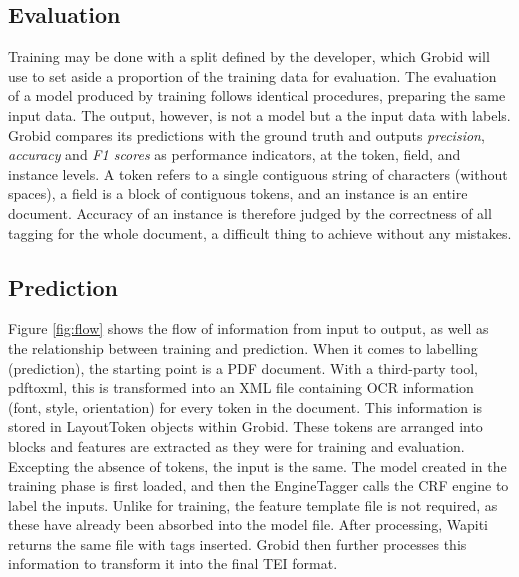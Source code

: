 \documentclass[11pt, oneside]{scrartcl}   	%
\begin{document}
\subsection{Evaluation}

Training may be done with a split defined by the developer, which Grobid will use to set aside a proportion of the training data for evaluation. The evaluation of a model produced by training follows identical procedures, preparing the same input data. The output, however, is not a model but a the input data with labels. Grobid compares its predictions with the ground truth and outputs \emph{precision}, \emph{accuracy} and \emph{F1 scores} as performance indicators, at the token, field, and instance levels. A token refers to a single contiguous string of characters (without spaces), a field is a block of contiguous tokens, and an instance is an entire document. Accuracy of an instance is therefore judged by the correctness of all tagging for the whole document, a difficult thing to achieve without any mistakes.

\subsection{Prediction}

Figure \ref{fig:flow} shows the flow of information from input to output, as well as the relationship between training and prediction. When it comes to labelling (prediction), the starting point is a PDF document. With a third-party tool, pdftoxml, this is transformed into an XML file containing OCR information (font, style, orientation) for every token in the document. This information is stored in LayoutToken objects within Grobid. These tokens are arranged into blocks and features are extracted as they were for training and evaluation. Excepting the absence of tokens, the input is the same. The model created in the training phase is first loaded, and then the EngineTagger calls the CRF engine to label the inputs. Unlike for training, the feature template file is not required, as these have already been absorbed into the model file. After processing, Wapiti returns the same file with tags inserted. Grobid then further processes this information to transform it into the final TEI format.
\end{document}
